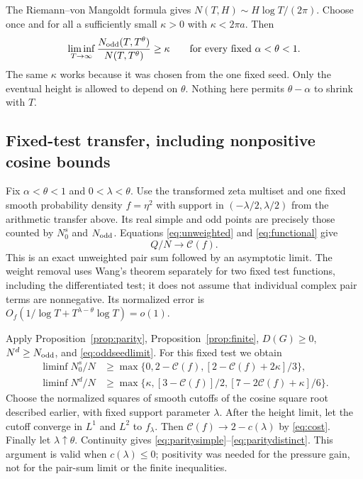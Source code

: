 \documentclass[11pt]{article}
\theoremstyle{remark}
\newcommand{\cC}{\mathcal C}
\begin{document}
The Riemann--von Mangoldt formula gives
$N(T,H)\sim H\log T/(2\pi)$. Choose once and for all a sufficiently
small $\kappa>0$ with $\kappa<2\pi a$. Then
\begin{equation}\label{eq:oddseedlimit}
 \liminf_{T\to\infty}\frac{N_{\rm odd}(T,T^\theta)}{N(T,T^\theta)}
 \ge\kappa
 \qquad\hbox{for every fixed }\alpha<\theta<1.
\end{equation}
The same $\kappa$ works because it was chosen from the one fixed seed.
Only the eventual height is allowed to depend on $\theta$. Nothing here
permits $\theta-\alpha$ to shrink with $T$.

\subsection{Fixed-test transfer, including nonpositive cosine bounds}

Fix $\alpha<\theta<1$ and $0<\lambda<\theta$. Use the transformed
zeta multiset and one fixed smooth probability density $f=\eta^2$ with
support in $(-\lambda/2,\lambda/2)$ from the arithmetic transfer above.
Its real simple and odd points are precisely those counted by $N_0^s$
and $N_{\rm odd}$. Equations \eqref{eq:unweighted} and
\eqref{eq:functional} give
\[
 Q/N\longrightarrow\cC(f).
\]
This is an exact unweighted pair sum followed by an asymptotic limit.
The weight removal uses Wang's theorem separately for two fixed test
functions, including the differentiated test; it does not assume that
individual complex pair terms are nonnegative. Its normalized error is
$O_f(1/\log T+T^{\lambda-\theta}\log T)=o(1)$.

Apply Proposition~\ref{prop:parity}, Proposition~\ref{prop:finite},
$D(G)\ge0$, $N^d\ge N_{\rm odd}$, and \eqref{eq:oddseedlimit}.
For this fixed test we obtain
\begin{align*}
\liminf N_0^s/N&\ge\max\{0,2-\cC(f),[2-\cC(f)+2\kappa]/3\},\\
\liminf N^d/N&\ge\max\{\kappa,[3-\cC(f)]/2,
                            [7-2\cC(f)+\kappa]/6\}.
\end{align*}
Choose the normalized squares of smooth cutoffs of the cosine square
root described earlier, with fixed support parameter $\lambda$.
After the height limit, let the cutoff converge in $L^1$ and $L^2$ to
$f_\lambda$. Then $\cC(f)\to2-c(\lambda)$ by \eqref{eq:cost}.
Finally let $\lambda\uparrow\theta$. Continuity gives
\eqref{eq:paritysimple}--\eqref{eq:paritydistinct}. This argument is
valid when $c(\lambda)\le0$; positivity was needed for the pressure gain,
not for the pair-sum limit or the finite inequalities.
\end{document}
